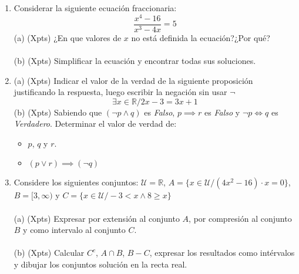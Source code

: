 \documentclass[a4paper]{article}
\begin{document}
\begin{enumerate}
        (b) (Xpts) Calcular \textbf{todas} las raíces de la ecuación $x^4 -8x^2 +16=0$.\\\\
        (c) (Xpts) Considerar la ecuación $ax^2+5x+c$. Determinar los valores de $a$ y $c$ sabiendo que la suma de sus raíces es $-5$ y el producto de sus raíces es $6$.
        \item Considerar la siguiente ecuación fraccionaria:
        \begin{equation*}
                \frac{x^4-16}{x^3-4x}=5
        \end{equation*}
        (a) (Xpts) ¿En que valores de $x$ no está definida la ecuación?¿Por qué?\\\\
        (b) (Xpts) Simplificar la ecuación y encontrar todas sus soluciones.
        \item (a) (Xpts) Indicar el valor de la verdad de la siguiente proposición justificando la respuesta, luego escribir la negación sin usar $\neg$ 
        \begin{equation*}
                \exists x \in \mathbb{R} / 2x-3=3x+1
        \end{equation*}
        (b) (Xpts) Sabiendo que $(\neg p \wedge q)$ es \textit{Falso}, $p \implies r$ es \textit{Falso} y $\neg p \iff q$ es \textit{Verdadero}. Determinar el valor de verdad de:
        \begin{itemize}
                \item $p$, $q$ y $r$.
                \item $(p \vee r) \implies (\neg q)$
        \end{itemize}
        \item Considere los siguientes conjuntos: $\mathcal{U}=\mathbb{R}$, $A=\{x \in \mathcal{U}/(4x^2-16)\cdot x=0\}$, $B=[3, \infty)$ y $C=\{x\in \mathcal{U}/-3< x \wedge 8\geq x\}$\\\\
        (a) (Xpts) Expresar por extensión al conjunto $A$, por compresión al conjunto $B$ y como intervalo al conjunto $C$.\\\\
        (b) (Xpts) Calcular $C^c$, $A \cap B$, $B-C$, expresar los resultados como intérvalos y dibujar los conjuntos solución en la recta real.
\end{enumerate}
\end{document}
